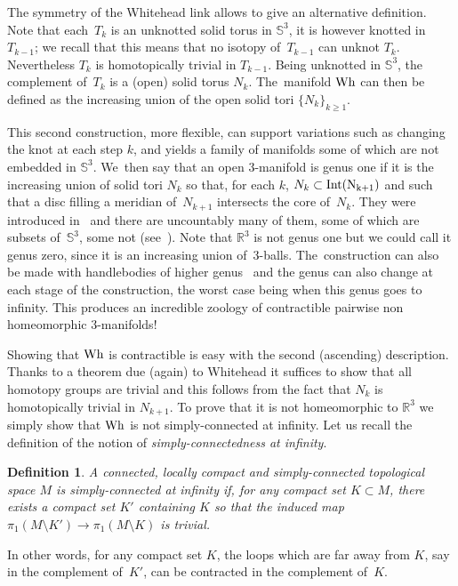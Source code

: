 \documentclass[10pt,a4paper]{amsart}
\numberwithin{equation}{section}
\newtheorem{defi}[theor]{Definition}
\begin{document}
The symmetry of the Whitehead link allows to give an alternative definition. Note that each~$T_{k}$ is an unknotted solid torus in $\mathbb{S}^{3}$, it is however knotted in $T_{k-1}$; we recall that this means that no isotopy of~$T_{k-1}$ can unknot $T_{k}$. Nevertheless $T_{k}$ is homotopically trivial in $T_{k-1}$. Being unknotted in $\mathbb{S}^{3}$, the complement of~$T_{k}$ is a (open) solid torus $N_{k}$. The~manifold $\rm Wh$ can then be defined as the increasing union of the open solid tori $\{N_{k}\}_{k\geq 1}$.

This second construction, more flexible, can support variations such as changing the knot at each step $k$, and yields a family of manifolds some of which are not embedded in $\mathbb{S}^{3}$. We~then say that an open $3$-manifold is genus one if it is the increasing union of solid tori $N_k$ so that, for each $k$, $N_k\subset \rm{Int}(N_{k+1})$ and such that a disc filling a meridian of~$N_{k+1}$ intersects the core of~$N_k$. They were introduced in~\cite{McMil} and there are uncountably many of them, some of which are subsets of~$\mathbb{S}^3$, some not (see~\cite{K-Mil}). Note that $\mathbb{R}^{3}$ is not genus one but we
could call it genus zero, since it is an increasing union of~$3$-balls. The~construction can also be made with handlebodies of higher genus~\cite{McMil} and the genus can also change at each stage of the construction, the worst case being when this genus goes to infinity. This produces an incredible zoology of contractible pairwise non homeomorphic $3$-manifolds!

Showing that $\rm Wh$ is contractible is easy with the second (ascending) description. Thanks to a theorem due (again) to Whitehead it suffices to show that all homotopy groups are trivial and this follows from the fact that $N_k$ is homotopically trivial in $N_{k+1}$. To prove that it is not homeomorphic to $\mathbb{R}^{3}$ we simply show that $\rm Wh$ is not simply-connected at infinity. Let us recall the definition of the notion of {\it simply-connectedness at infinity}.

\begin{defi}
A connected, locally compact and simply-connected topological space $M$ is \emph{simply-connected at infinity} if, for any compact set $K\subset M$, there exists a compact set $K'$ containing $K$ so that the induced map $\pi_{1}(M\setminus K')\rightarrow \pi_{1}(M\setminus K)$ is trivial.
\end{defi}

In other words, for any compact set $K$, the loops which are far away from $K$, say in the complement of~$K'$, can be contracted in the complement
of~$K$.
\end{document}

